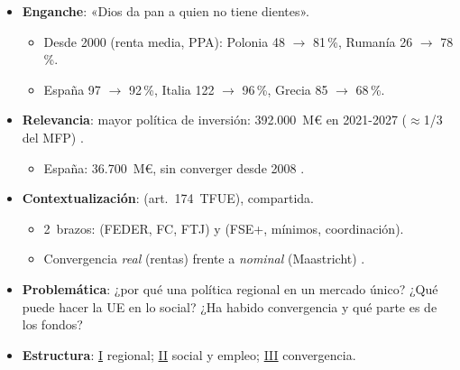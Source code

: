 \documentclass{article}
\begin{document}
\cabecerarepaso
\begin{columnas}

\begin{itemize}
\item \textbf{Enganche}: «Dios da pan a quien no tiene dientes».
  \begin{itemize}
  \item Desde 2000 (renta media, PPA): Polonia 48 $\to$ 81\,\%, Rumanía 26 $\to$ 78\,\%.
  \item España 97 $\to$ 92\,\%, Italia 122 $\to$ 96\,\%, Grecia 85 $\to$ 68\,\%.
  \end{itemize}
\item \textbf{Relevancia}: mayor política de inversión: 392.000~M€ en 2021-2027 ($\approx$1/3 del MFP) .
  \begin{itemize}
  \item España: 36.700~M€, sin converger desde 2008 .
  \end{itemize}
\item \textbf{Contextualización}:  (art.~174~TFUE), compartida.
  \begin{itemize}
  \item 2~brazos:  (FEDER, FC, FTJ) y  (FSE+, mínimos, coordinación).
  \item Convergencia \emph{real} (rentas) frente a \emph{nominal} (Maastricht) .
  \end{itemize}
\item \textbf{Problemática}: ¿por qué una política regional en un mercado único? ¿Qué puede hacer la UE en lo social? ¿Ha habido convergencia y qué parte es de los fondos?
\item \textbf{Estructura}: \hyperref[rep:I]{I} regional; \hyperref[rep:II]{II} social y empleo; \hyperref[rep:III]{III} convergencia.
\end{itemize}


\end{columnas}
\end{document}
